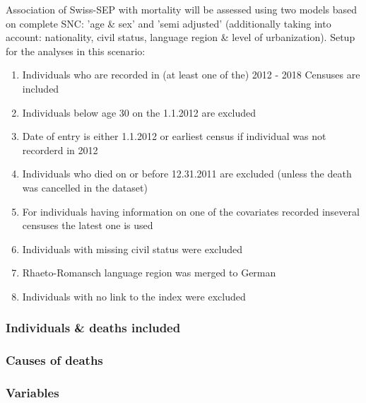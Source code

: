 \documentclass[a4paper, notitlepage, fleqn]{article} %
\begin{document}
Association of Swiss-SEP with mortality will be assessed using two models based on complete SNC: 
'age \& sex' and 'semi adjusted'  
(additionally taking into account: nationality, civil status, language region \& level of urbanization). Setup for the analyses in this scenario: 
\begin{enumerate}

	\item Individuals who are recorded in (at least one of the) 2012 - 2018 Censuses are included
	\item Individuals below age 30 on the 1.1.2012 are excluded
	\item Date of entry is either 1.1.2012 or earliest census if individual was not recorderd in 2012
	\item Individuals who died on or before 12.31.2011 are excluded (unless the death was cancelled in the dataset)
	\item For individuals having information on one of the covariates recorded inseveral censuses the latest one is used
	\item Individuals with missing civil status were excluded
	\item Rhaeto-Romansch language region was merged to German
	\item Individuals with no link to the index were excluded
	
\end{enumerate}

\subsubsection{Individuals \& deaths included}
\begin{stlog}\end{stlog}
\subsubsection{Causes of deaths}
\begin{stlog}\end{stlog}
\subsubsection{Variables}
\begin{stlog}\end{stlog}
\end{document}
